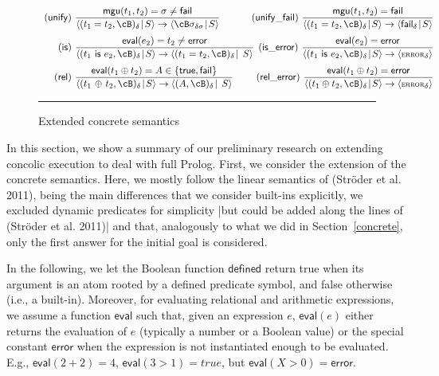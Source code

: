 \documentclass[fleqn]{tlp}
\newcommand{\mgu}{\mathsf{mgu}}
\newcommand{\error}{\mathsf{error}}
\newcommand{\fail}{\mathsf{fail}}
\newcommand{\eval}{\mathsf{eval}}
\newcommand{\midd}{\!\mid\!}
\newcommand{\errorsc}{\mbox{\footnotesize \textsc{error}}}
\def \tuple#1{\langle #1 \rangle}
\begin{document}
\begin{appendix}
\begin{figure}[b]
\[\begin{array}{r@{~}l}
    \mathsf{(unify)} & {\displaystyle 
      \frac{\mgu(t_1,t_2)=\sigma\neq\fail} 
        {\tuple{(t_1=t_2,\cB)_\delta\midd S}
          \to
          \tuple{\cB\sigma_{\delta\sigma}\midd S}}
        } \hfill\hspace{3ex}
    \mathsf{(unify\_fail)} ~ {\displaystyle 
      \frac{\mgu(t_1,t_2)=\fail} 
        {\tuple{(t_1=t_2,\cB)_\delta\midd S}
          \to
          \tuple{\fail_{\delta}\midd S}}
        } \\[3ex]

    \mathsf{(is)} & {\displaystyle 
      \frac{\mathsf{eval}(e_2) = t_2 \neq \error} 
        {\tuple{(t_1~\mathsf{is}~e_2,\cB)_\delta\midd S}
          \to
          \tuple{(t_1=t_2,\cB)_\delta\midd ~ S}}
        } \hfill\hspace{1ex}
    \mathsf{(is\_error)} ~ {\displaystyle 
      \frac{\mathsf{eval}(e_2) = \error} 
        {\tuple{(t_1~\mathsf{is}~e_2,\cB)_\delta\midd S}
          \to
          \tuple{\errorsc_\delta}}
        } \\[3ex]

    \mathsf{(rel)} & {\displaystyle 
      \frac{\mathsf{eval}(t_1\oplus t_2) = A \in\{\mathsf{true},\mathsf{fail}\}} 
        {\tuple{(t_1~{\oplus}~t_2,\cB)_\delta\midd S}
          \to
          \tuple{(A,\cB)_\delta\midd ~ S}}
        } \hfill\hspace{1ex}
    \mathsf{(rel\_error)} ~ {\displaystyle 
      \frac{\mathsf{eval}(t_1\oplus t_2) = \error} 
        {\tuple{(t_1\oplus t_2,\cB)_\delta\midd S}
          \to
          \tuple{\errorsc_\delta}}
        }
    \end{array}
    \]
  \rule{\linewidth}{1pt}
  \caption{Extended concrete semantics} 
  \label{fig:concrete3}
\end{figure}

In this section, we show a summary of our preliminary research on
extending concolic execution to deal with full Prolog. First, we
consider the extension of the concrete semantics. Here, we mostly
follow the linear semantics of 
(Str{\"o}der et al. 2011),
being the main
differences that we consider built-ins explicitly, we excluded dynamic
predicates for simplicity |but could be added along the lines of
(Str{\"o}der et al. 2011)|
and that, analogously to what we did in
Section~\ref{concrete}, only the first answer for the initial goal is
considered.

In the following, we let the Boolean function $\mathsf{defined}$
return true when its argument is an atom rooted by a defined predicate
symbol, and false otherwise (i.e., a built-in). Moreover, for evaluating
relational and arithmetic expressions, we assume a function
$\mathsf{eval}$ such that, given an expression $e$, $\mathsf{eval}(e)$
either returns the evaluation of $e$ (typically a number or a Boolean
value) or the special constant $\error$ when the expression is not
instantiated enough to be evaluated. E.g., $\eval(2+2) = 4$,
$\eval(3>1) = \mathit{true}$, but $\eval(X>0) = \error$.


\end{appendix}
\end{document}
